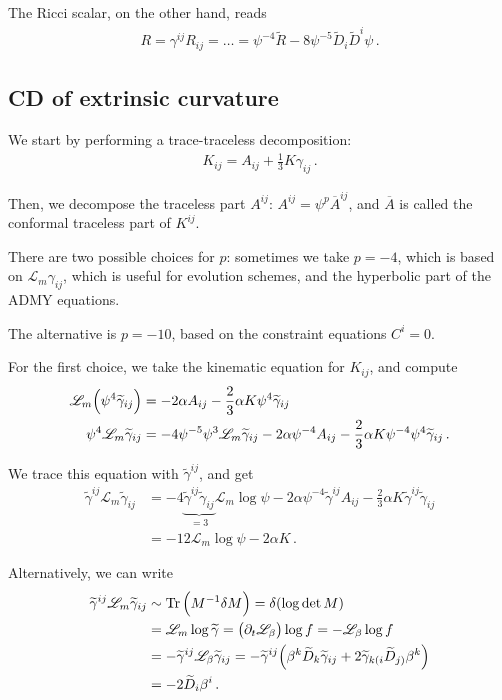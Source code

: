 \documentclass[main.tex]{subfiles}
\begin{document}
The Ricci scalar, on the other hand, reads 
%
\begin{align}
R = \gamma^{ij} R_{ij} = \dots = \psi^{-4} \widetilde{R} - 8 \psi^{-5} \widetilde{D}_i \widetilde{D}^{i} \psi 
\,.
\end{align}

\subsection{CD of extrinsic curvature}

We start by performing a trace-traceless decomposition: 
%
\begin{align}
K_{ij} = A_{ij} + \frac{1}{3} K \gamma_{ij}
\,.
\end{align}

Then, we decompose the traceless part \(A^{ij}\): \(A^{ij} = \psi^{p} \overline{A}^{ij}\), and \(\overline{A}\) is called the conformal 
traceless part of \(K^{ij}\). 

There are two possible choices for \(p\): sometimes we take \(p = -4\), which is based on \(\mathscr{L}_m \gamma_{ij}\), which is useful for evolution schemes, and the hyperbolic part of the ADMY equations. 

The alternative is \(p = -10\), based on the constraint equations \(C^{i}= 0\). 

For the first choice, we take the kinematic equation for \(K_{ij}\), and compute 
%
\begin{align}
\mathscr{L}_m \qty(\psi^{4} \widetilde{\gamma}_{ij}) &= - 2 \alpha A_{ij} - \frac{2}{3} \alpha K \psi^{4} \widetilde{\gamma}_{ij}  \\
\psi^{4} \mathscr{L}_m \widetilde{\gamma}_{ij} &= - 4 \psi^{-5} \psi^3 \mathscr{L}_m \widetilde{\gamma}_{ij} - 2 \alpha \psi^{-4} A_{ij} - \frac{2}{3} \alpha K \psi^{-4} \psi^{4} \widetilde{\gamma}_{ij} 
\,.
\end{align}

We trace this equation with \(\widetilde{\gamma}^{ij}\), and get 
%
\begin{align}
\widetilde{\gamma}^{ij} \mathscr{L}_m \widetilde{\gamma}_{ij} &= - 4 \underbrace{\widetilde{\gamma}^{ij} \widetilde{\gamma}_{ij}}_{=3} \mathscr{L}_m \log \psi 
- 2 \alpha \psi^{-4} \widetilde{\gamma}^{ij} A_{ij} - \frac{2}{3} \alpha K \widetilde{\gamma}^{ij} \widetilde{\gamma}_{ij}  \\
&= - 12 \mathscr{L}_m \log \psi - 2 \alpha K
\,.
\end{align}

Alternatively, we can write 
%
\begin{align}
\widetilde{\gamma}^{ij} \mathscr{L}_m \widetilde{\gamma}_{ij} &\sim \Tr \qty(M^{-1} \delta M) = \delta (\log \det M)  \\
&= \mathscr{L}_m \log \widetilde{\gamma} = \qty(\partial_{t} \mathscr{L}_\beta ) \log f  = - \mathscr{L}_\beta \log f   \\
&= - \widetilde{\gamma}^{ij} \mathscr{L}_\beta \widetilde{\gamma}_{ij} 
= - \widetilde{\gamma}^{ij} \qty(\beta^{k} \widetilde{D}_{k} \widetilde{\gamma}_{ij} + 2 \widetilde{\gamma}_{k (i} \widetilde{D}_{j)} \beta^{k})  \\
&= -2 \widetilde{D}_{i} \beta^{i}
\,.
\end{align}
\end{document}
